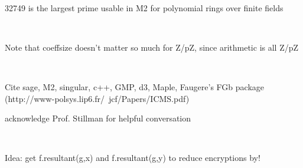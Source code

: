 \documentclass[11pt]{report}
\begin{document}
\

32749 is the largest prime usable in M2 for polynomial rings over finite fields

\

Note that coeffsize doesn't matter so much for Z/pZ, since arithmetic is all Z/pZ

\

Cite sage, M2, singular, c++, GMP, d3, Maple, Faugere's FGb package (http://www-polsys.lip6.fr/~jcf/Papers/ICMS.pdf)

acknowledge Prof. Stillman for helpful conversation

\

Idea: get f.resultant(g,x) and f.resultant(g,y) to reduce encryptions by!
\end{document}
